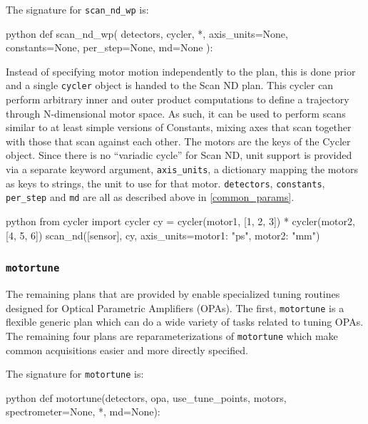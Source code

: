 The signature for \texttt{scan\_nd\_wp} is:

\begin{codefragment}{python}
def scan_nd_wp(
    detectors, cycler, *, axis_units=None, constants=None, per_step=None, md=None
):
\end{codefragment}

Instead of specifying motor motion independently to the plan, this is done prior and a single \texttt{cycler}\cite{cycler} object is handed to the Scan ND plan.
This cycler can perform arbitrary inner and outer product computations to define a trajectory through N-dimensional motor space.
As such, it can be used to perform scans similar to at least simple versions of Constants, mixing axes that scan together with those that scan against each other.
The motors are the keys of the Cycler object.
Since there is no ``variadic cycle'' for Scan ND, \wrightplans unit support is provided via a separate keyword argument, \texttt{axis\_units}, a dictionary mapping the motors as keys to strings, the unit to use for that motor.
\texttt{detectors}, \texttt{constants}, \texttt{per\_step} and \texttt{md} are all as described above in \ref{common_params}.

\begin{codefragment}{python}
from cycler import cycler
cy = cycler(motor1, [1, 2, 3]) * cycler(motor2, [4, 5, 6])
scan_nd([sensor], cy, axis_units={motor1: "ps", motor2: "mm"})
\end{codefragment}


\subsubsection{\texttt{motortune}}

The remaining plans that are provided by \wrightplans enable specialized tuning routines designed for Optical Parametric Amplifiers (OPAs).
The first, \texttt{motortune} is a flexible generic plan which can do a wide variety of tasks related to tuning OPAs.
The remaining four plans are reparameterizations of \texttt{motortune} which make common acquisitions easier and more directly specified.

The signature for \texttt{motortune} is:

\begin{codefragment}{python}
def motortune(detectors, opa, use_tune_points, motors, spectrometer=None, *, md=None):
\end{codefragment}

